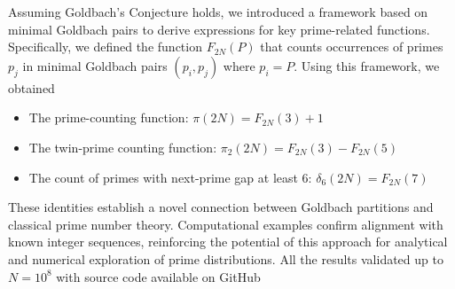 Assuming Goldbach's Conjecture holds, we introduced a framework based on minimal
Goldbach pairs to derive expressions for key prime-related functions.
Specifically, we defined the function $F_{2N}(P)$ that counts occurrences of primes $p_j$ in minimal Goldbach
pairs $(p_i, p_j)$ where $p_i = P$.
Using this framework, we obtained

\begin{itemize}
    \item The prime-counting function: $\pi(2N) = F_{2N}(3) + 1$
    \item The twin-prime counting function: $\pi_2(2N) = F_{2N}(3) - F_{2N}(5)$
    \item The count of primes with next-prime gap at least 6: $\delta_6(2N) = F_{2N}(7)$
\end{itemize}

These identities establish a novel connection between Goldbach partitions and classical prime number theory.
Computational examples confirm alignment with known integer sequences, reinforcing the potential
of this approach for analytical and numerical exploration of prime distributions.
All the results validated up to $N=10^8$ with source code available on GitHub
